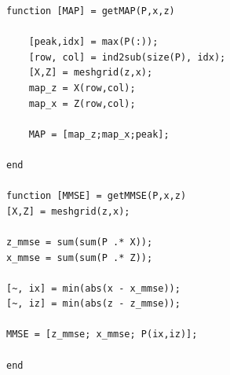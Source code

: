 \documentclass[11pt]{article}
\begin{document}
\begin{lstlisting}[style = matlab]
function [MAP] = getMAP(P,x,z)

    [peak,idx] = max(P(:));
    [row, col] = ind2sub(size(P), idx);
    [X,Z] = meshgrid(z,x);
    map_z = X(row,col);
    map_x = Z(row,col);

    MAP = [map_z;map_x;peak];

end

function [MMSE] = getMMSE(P,x,z)
[X,Z] = meshgrid(z,x);

z_mmse = sum(sum(P .* X));
x_mmse = sum(sum(P .* Z));

[~, ix] = min(abs(x - x_mmse));
[~, iz] = min(abs(z - z_mmse));

MMSE = [z_mmse; x_mmse; P(ix,iz)];

end

\end{lstlisting}
\section{}
\end{document}

